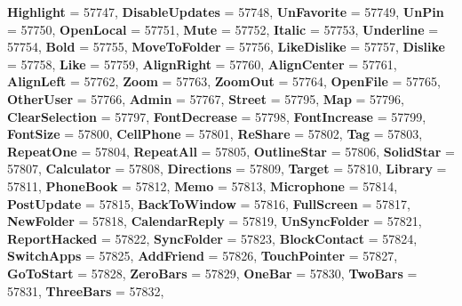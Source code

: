 \begin{DoxyCompactItemize}
{\bfseries Highlight} = 57747, 
{\bfseries Disable\+Updates} = 57748, 
{\bfseries Un\+Favorite} = 57749, 
{\bfseries Un\+Pin} = 57750, 
\newline
{\bfseries Open\+Local} = 57751, 
{\bfseries Mute} = 57752, 
{\bfseries Italic} = 57753, 
{\bfseries Underline} = 57754, 
\newline
{\bfseries Bold} = 57755, 
{\bfseries Move\+To\+Folder} = 57756, 
{\bfseries Like\+Dislike} = 57757, 
{\bfseries Dislike} = 57758, 
\newline
{\bfseries Like} = 57759, 
{\bfseries Align\+Right} = 57760, 
{\bfseries Align\+Center} = 57761, 
{\bfseries Align\+Left} = 57762, 
\newline
{\bfseries Zoom} = 57763, 
{\bfseries Zoom\+Out} = 57764, 
{\bfseries Open\+File} = 57765, 
{\bfseries Other\+User} = 57766, 
\newline
{\bfseries Admin} = 57767, 
{\bfseries Street} = 57795, 
{\bfseries Map} = 57796, 
{\bfseries Clear\+Selection} = 57797, 
\newline
{\bfseries Font\+Decrease} = 57798, 
{\bfseries Font\+Increase} = 57799, 
{\bfseries Font\+Size} = 57800, 
{\bfseries Cell\+Phone} = 57801, 
\newline
{\bfseries Re\+Share} = 57802, 
{\bfseries Tag} = 57803, 
{\bfseries Repeat\+One} = 57804, 
{\bfseries Repeat\+All} = 57805, 
\newline
{\bfseries Outline\+Star} = 57806, 
{\bfseries Solid\+Star} = 57807, 
{\bfseries Calculator} = 57808, 
{\bfseries Directions} = 57809, 
\newline
{\bfseries Target} = 57810, 
{\bfseries Library} = 57811, 
{\bfseries Phone\+Book} = 57812, 
{\bfseries Memo} = 57813, 
\newline
{\bfseries Microphone} = 57814, 
{\bfseries Post\+Update} = 57815, 
{\bfseries Back\+To\+Window} = 57816, 
{\bfseries Full\+Screen} = 57817, 
\newline
{\bfseries New\+Folder} = 57818, 
{\bfseries Calendar\+Reply} = 57819, 
{\bfseries Un\+Sync\+Folder} = 57821, 
{\bfseries Report\+Hacked} = 57822, 
\newline
{\bfseries Sync\+Folder} = 57823, 
{\bfseries Block\+Contact} = 57824, 
{\bfseries Switch\+Apps} = 57825, 
{\bfseries Add\+Friend} = 57826, 
\newline
{\bfseries Touch\+Pointer} = 57827, 
{\bfseries Go\+To\+Start} = 57828, 
{\bfseries Zero\+Bars} = 57829, 
{\bfseries One\+Bar} = 57830, 
\newline
{\bfseries Two\+Bars} = 57831, 
{\bfseries Three\+Bars} = 57832, 

\end{DoxyCompactItemize}
